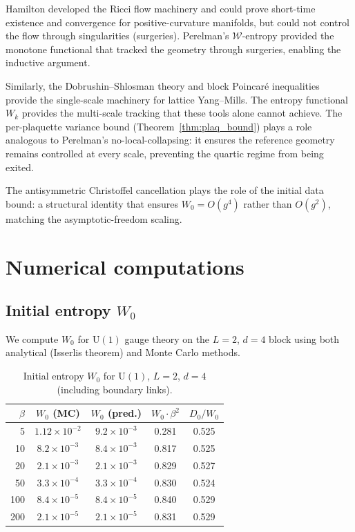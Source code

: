 \documentclass[11pt]{article}
\theoremstyle{definition}
\begin{document}
Hamilton developed the Ricci flow machinery and could prove short-time 
existence and convergence for positive-curvature manifolds, but could 
not control the flow through singularities (surgeries).  Perelman's 
$\mathcal{W}$-entropy provided the monotone functional that tracked 
the geometry through surgeries, enabling the inductive argument.

Similarly, the Dobrushin--Shlosman theory and block Poincar\'e inequalities 
provide the single-scale machinery for lattice Yang--Mills.  The entropy 
functional $W_k$ provides the multi-scale tracking that these tools 
alone cannot achieve.  The per-plaquette variance bound 
(Theorem~\ref{thm:plaq_bound}) plays a role analogous to Perelman's 
no-local-collapsing: it ensures the reference geometry remains controlled 
at every scale, preventing the quartic regime from being exited.

The antisymmetric Christoffel cancellation plays the role of the 
initial data bound: a structural identity that ensures 
$W_0 = O(g^4)$ rather than $O(g^2)$, matching the asymptotic-freedom 
scaling.


\section{Numerical computations}\label{sec:numerics}

\subsection{Initial entropy $W_0$}

We compute $W_0$ for $\mathrm{U}(1)$ gauge theory on the $L = 2$, 
$d = 4$ block using both analytical (Isserlis theorem) and Monte Carlo 
methods.

\begin{table}[h]
\centering
\caption{Initial entropy $W_0$ for $\mathrm{U}(1)$, $L = 2$, $d = 4$ 
(including boundary links).}
\label{tab:W0}
\begin{tabular}{rcccc}
\toprule
$\beta$ & $W_0$ (MC) & $W_0$ (pred.) & $W_0 \cdot \beta^2$ & $D_0/W_0$ \\
\midrule
5 & $1.12 \times 10^{-2}$ & $9.2 \times 10^{-3}$ & 0.281 & 0.525 \\
10 & $8.2 \times 10^{-3}$ & $8.4 \times 10^{-3}$ & 0.817 & 0.525 \\
20 & $2.1 \times 10^{-3}$ & $2.1 \times 10^{-3}$ & 0.829 & 0.527 \\
50 & $3.3 \times 10^{-4}$ & $3.3 \times 10^{-4}$ & 0.830 & 0.524 \\
100 & $8.4 \times 10^{-5}$ & $8.4 \times 10^{-5}$ & 0.840 & 0.529 \\
200 & $2.1 \times 10^{-5}$ & $2.1 \times 10^{-5}$ & 0.831 & 0.529 \\
\bottomrule
\end{tabular}
\end{table}
\end{document}
